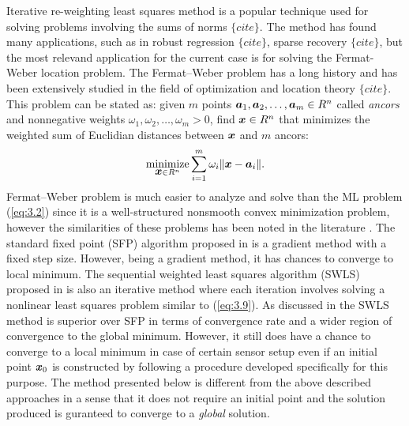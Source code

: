 Iterative re-weighting least squares method is a popular technique used for solving problems involving the sums of norms $\{cite\}$. The method has found many applications, such as in robust regression $\{cite\}$, sparse recovery $\{cite\}$, but the most relevand application for the current case is for solving the Fermat-Weber location problem. The Fermat--Weber problem %
has a long history and has been extensively studied in the field of optimization and location theory $\{cite\}$. This problem can be stated as: given $m$ points $\mbox{\boldmath$a$}_1, \mbox{\boldmath$a$}_2, \ldots, \mbox{\boldmath$a$}_m \in R^n$ called \textit{ancors} and nonnegative weights $\omega_1, \omega_2, \ldots, \omega_m > 0$, find $\mbox{\boldmath$x$} \in R^n$ that minimizes the weighted sum of Euclidian distances between $\mbox{\boldmath$x$}$ and $m$ ancors:
\begin{equation} \label{eq:FW}
\nonumber
\mathop{\mbox{minimize}}_{\mbox{\boldmath$x$} \in R^n} \sum_{i=1}^{m} \omega_i\|\mbox{\boldmath$x$} - \mbox{\boldmath$a$}_i\|.
\end{equation}
Fermat--Weber problem is much easier to analyze and solve than the ML problem (\ref{eq:3.2}) since it is a well-structured
nonsmooth convex minimization problem, however the similarities of these problems has been noted in the literature \cite{BeckTeCh}.
The standard fixed point (SFP) algorithm proposed in \cite{BeckTeCh} is a gradient method with a fixed step size. However, being a gradient method, it has chances to converge to local minimum. The sequential weighted least squares algorithm (SWLS) proposed in \cite{BeckTeCh} is also an iterative method where each iteration involves solving a nonlinear least squares problem similar to (\ref{eq:3.9}). As discussed in  \cite{BeckTeCh} the SWLS method is superior over SFP in terms of convergence rate and a wider region of convergence to the global minimum. However, it still does have a chance to converge to a local minimum in case of certain sensor setup even if an initial point $\mbox{\boldmath$x$}_0$ is constructed by following a procedure developed specifically for this purpose. The method presented below is different from the above described approaches in a sense that it does not require an initial point and the solution produced is guranteed to converge to a \textit{global} solution. 

